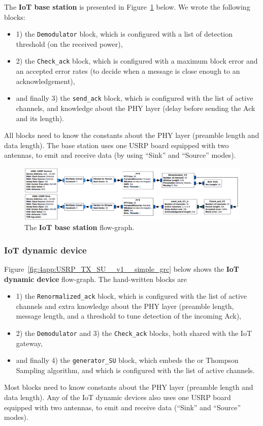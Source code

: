 The \textbf{IoT base station} is presented in Figure~\ref{fig:4app:USRP_RX_BTS__v1__simple_grc} below.
%
We wrote the following blocks:
\begin{itemize}
    \item
    1) the \texttt{Demodulator} block, which is configured with a list of detection threshold (on the received power),
    \item
    2) the \texttt{Check\_ack} block, which is configured with a maximum block error and an accepted error rates (to decide when a message is close enough to an acknowledgement),
    \item
    and finally
    3) the \texttt{send\_ack} block, which is configured with the list of active channels, and knowledge about the PHY layer (delay before sending the Ack and its length).
\end{itemize}
All blocks need to know the constants about the PHY layer (preamble length and data length).
The base station uses one USRP board equipped with two antennas,
to emit and receive data (by using ``Sink'' and ``Source'' modes).

\begin{figure}[!h]
    \includegraphics[width=1.00\textwidth]{2-Chapters/4-Chapter/Images/USRP_RX_BTS__v1__simple_grc.png}
    \caption{The \textbf{IoT base station} flow-graph.}
    \label{fig:4app:USRP_RX_BTS__v1__simple_grc}
\end{figure}


\subsubsection*{IoT dynamic device}

Figure~\ref{fig:4app:USRP_TX_SU__v1__simple_grc} below shows the \textbf{IoT dynamic device} flow-graph.
The hand-written blocks are
\begin{itemize}
    \item
    1) the \texttt{Renormalized\_ack} block, which is configured with the list of active channels and extra knowledge about the PHY layer (preamble length, message length, and a threshold to tune detection of the incoming Ack),
    \item
    2) the \texttt{Demodulator} and 3) the \texttt{Check\_ack} blocks, both shared with the IoT gateway,
    \item
    and finally 4) the \texttt{generator\_SU} block, which embeds the \UCB{} or Thompson Sampling algorithm, and which is configured with the list of active channels.
\end{itemize}
Most blocks need to know constants about the PHY layer (preamble length and data length).
Any of the IoT dynamic devices also uses one USRP board equipped with two antennas,
to emit and receive data (``Sink'' and ``Source'' modes).

